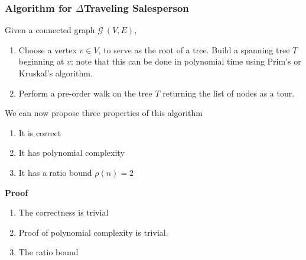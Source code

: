 \subsubsection{Algorithm for $\Delta$Traveling Salesperson}
Given a connected graph $\mathcal{G}\ (V,E)$,
\begin{enumerate}
    \item
        Choose a vertex $v \in V$, to serve as the root of a tree.
        Build a spanning tree $T$ beginning at $v$;
        note that this can be done in polynomial time using Prim's or Kruskal's algorithm.
    \item
        Perform a pre-order walk on the tree $T$ returning the list of nodes as a tour.
\end{enumerate}

We can now propose three properties of this algorithm
\begin{enumerate}
    \item It is correct
    \item It has polynomial complexity
    \item It has a ratio bound $\rho(n) = 2$
\end{enumerate}
\textbf{Proof}
\begin{enumerate}
    \item
        The correctness is trivial
    \item
        Proof of polynomial complexity is trivial.
    \item
        The ratio bound
\end{enumerate}

